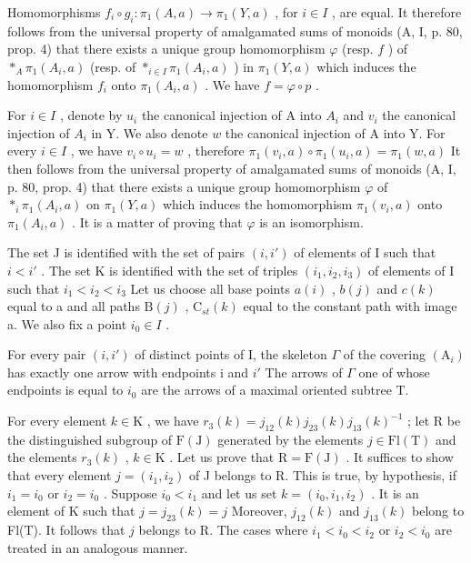 Homomorphisms \(f_i \circ g_i \colon \pi_1(A, a) \to \pi_1(Y, a)\) , for \(i \in I\) , are equal. It therefore follows from the universal property of amalgamated sums of monoids (A, I, p. 80, prop. 4) that there exists a unique group homomorphism \(\varphi\) (resp. \(f\) ) of \(*_{A} \pi_1(A_i, a)\) (resp. of \(*_{i \in I} \pi_1(A_i, a)\) ) in \(\pi_1(Y, a)\) which induces the homomorphism \(f_i\) onto \(\pi_1(A_i, a)\) . We have \(f = \varphi \circ p\) .

For \(i \in I\) , denote by \(u_i\) the canonical injection of A into \(A_i\) and \(v_i\) the canonical injection of \(A_i\) in Y. We also denote \(w\) the canonical injection of A into Y. For every \(i \in I\) , we have \(v_i \circ u_i = w\) , therefore \(\pi_1(v_i, a) \circ \pi_1(u_i, a) = \pi_1(w, a)\) It then follows from the universal property of amalgamated sums of monoids (A, I, p. 80, prop. 4) that there exists a unique group homomorphism \(\varphi\) of \(*_{i} \pi_1(A_i, a)\) on \(\pi_1(Y, a)\) which induces the homomorphism \(\pi_1(v_i, a)\) onto \(\pi_1(A_i, a)\) . It is a matter of proving that \(\varphi\) is an isomorphism.

The set J is identified with the set of pairs \((i, i')\) of elements of I such that \(i < i'\) . The set K is identified with the set of triples \((i_{1}, i_{2}, i_{3})\) of elements of I such that \(i_{1} < i_{2} < i_{3}\) Let us choose all base points \(a(i)\) , \(b(j)\) and \(c(k)\) equal to a and all paths \(\mathrm{B}(j)\) , \(\mathrm{C}_{st}(k)\) equal to the constant path with image a. We also fix a point \(i_{0} \in I\) .

For every pair \((i, i')\) of distinct points of I, the skeleton \(\Gamma\) of the covering \((\mathrm{A}_{i})\) has exactly one arrow with endpoints i and \(i'\) The arrows of \(\Gamma\) one of whose endpoints is equal to \(i_{0}\) are the arrows of a maximal oriented subtree T.

For every element \(k \in \mathrm{K}\) , we have \(r_3(k) = j_{12}(k)j_{23}(k)j_{13}(k)^{-1}\) ; let R be the distinguished subgroup of \(\mathrm{F(J)}\) generated by the elements \(j \in \mathrm{Fl(T)}\) and the elements \(r_3(k)\) , \(k \in \mathrm{K}\) . Let us prove that \(\mathrm{R} = \mathrm{F(J)}\) . It suffices to show that every element \(j = (i_1, i_2)\) of J belongs to R. This is true, by hypothesis, if \(i_1 = i_0\) or \(i_2 = i_0\) . Suppose \(i_0 < i_1\) and let us set \(k = (i_0, i_1, i_2)\) . It is an element of K such that \(j = j_{23}(k) = j\) Moreover, \(j_{12}(k)\) and \(j_{13}(k)\) belong to Fl(T). It follows that \(j\) belongs to R. The cases where \(i_1 < i_0 < i_2\) or \(i_2 < i_0\) are treated in an analogous manner.

